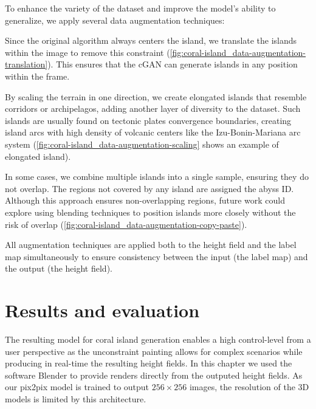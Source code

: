 \documentclass{egpubl}
\begin{document}
To enhance the variety of the dataset and improve the model's ability to generalize, we apply several data augmentation techniques:
\begin{Itemize}
         Since the original algorithm always centers the island, we translate the islands within the image to remove this constraint (\cref{fig:coral-island_data-augmentation-translation}). This ensures that the cGAN can generate islands in any position within the frame. 

         By scaling the terrain in one direction, we create elongated islands that resemble corridors or archipelagos, adding another layer of diversity to the dataset. Such islands are usually found on tectonic plates convergence boundaries, creating island arcs with high density of volcanic centers like the Izu-Bonin-Mariana arc system (\cref{fig:coral-island_data-augmentation-scaling} shows an example of elongated island). 

         In some cases, we combine multiple islands into a single sample, ensuring they do not overlap. The regions not covered by any island are assigned the abyss ID. Although this approach ensures non-overlapping regions, future work could explore using blending techniques to position islands more closely without the risk of overlap (\cref{fig:coral-island_data-augmentation-copy-paste}). 
\end{Itemize}

All augmentation techniques are applied both to the height field and the label map simultaneously to ensure consistency between the input (the label map) and the output (the height field).







\section{Results and evaluation}

The resulting model for coral island generation enables a high control-level from a user perspective as the unconstraint painting allows for complex scenarios while producing in real-time the resulting height fields. In this chapter we used the software Blender to provide renders directly from the outputed height fields. As our pix2pix model is trained to output $256\times256$ images, the resolution of the 3D models is limited by this architecture.
\end{document}
